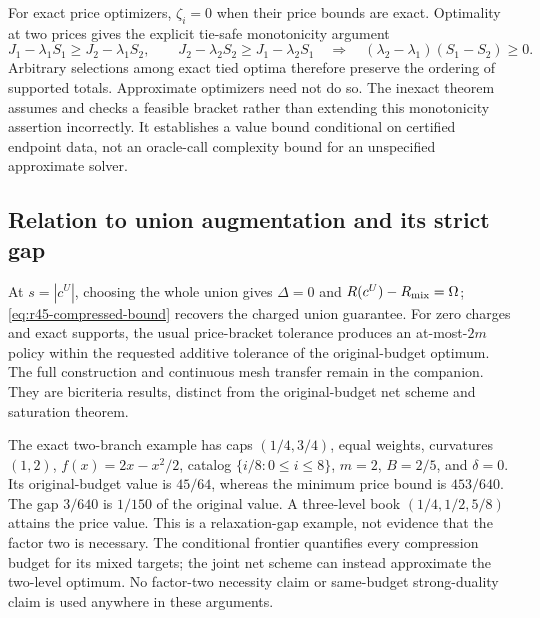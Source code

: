 For exact price optimizers, $\zeta_i=0$ when their price bounds are exact. Optimality at two prices gives the explicit tie-safe monotonicity argument
\[
 J_1-\lambda_1S_1\geq J_2-\lambda_1S_2,\qquad
 J_2-\lambda_2S_2\geq J_1-\lambda_2S_1
 \quad\Longrightarrow\quad
 (\lambda_2-\lambda_1)(S_1-S_2)\geq0.
\]
Arbitrary selections among exact tied optima therefore preserve the ordering of supported totals. Approximate optimizers need not do so. The inexact theorem assumes and checks a feasible bracket rather than extending this monotonicity assertion incorrectly. It establishes a value bound conditional on certified endpoint data, not an oracle-call complexity bound for an unspecified approximate solver.

\subsection{Relation to union augmentation and its strict gap}
At $s=|c^U|$, choosing the whole union gives $\Delta=0$ and
$R(c^U)-R_{\rm mix}=\Omega$; \eqref{eq:r45-compressed-bound} recovers the charged union guarantee. For zero charges and exact supports, the usual price-bracket tolerance produces an at-most-$2m$ policy within the requested additive tolerance of the original-budget optimum. The full construction and continuous mesh transfer remain in the companion. They are bicriteria results, distinct from the original-budget net scheme and saturation theorem.

The exact two-branch example has caps $(1/4,3/4)$, equal weights, curvatures $(1,2)$, $f(x)=2x-x^2/2$, catalog $\{i/8:0\leq i\leq8\}$, $m=2$, $B=2/5$, and $\delta=0$. Its original-budget value is $45/64$, whereas the minimum price bound is $453/640$. The gap $3/640$ is $1/150$ of the original value. A three-level book $(1/4,1/2,5/8)$ attains the price value. This is a relaxation-gap example, not evidence that the factor two is necessary. The conditional frontier quantifies every compression budget for its mixed targets; the joint net scheme can instead approximate the two-level optimum. No factor-two necessity claim or same-budget strong-duality claim is used anywhere in these arguments.
